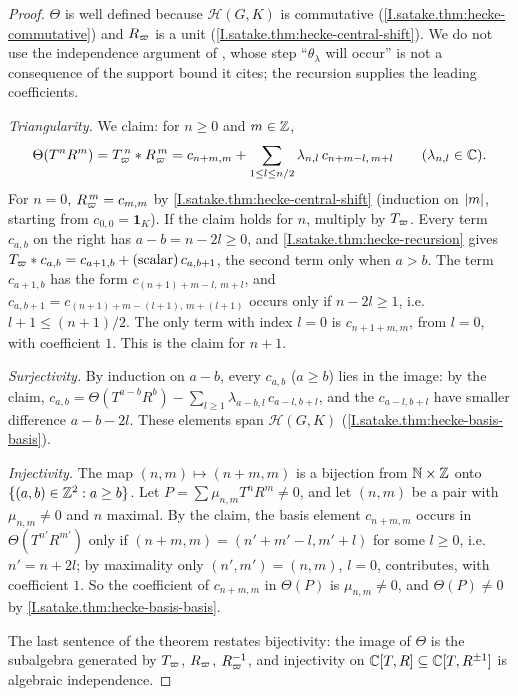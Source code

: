 \begin{theorem}
\end{theorem}
\begin{proof}
$\Theta$ is well defined because $\mathcal H(G,K)$ is commutative (\cref{I.satake.thm:hecke-commutative}) and
$R_\varpi$ is a unit (\cref{I.satake.thm:hecke-central-shift}). We do not use the independence argument of
\cite[Proposition~37]{BumpH}, whose step ``$\theta_\lambda$ will occur'' is not a consequence of the support bound it
cites; the recursion supplies the leading coefficients.

\emph{Triangularity.} We claim: for $n\ge0$ and $m\in\mathbb{Z}$,
\[
  \Theta(T^nR^m)=T_\varpi^{\,n}*R_\varpi^{\,m}=c_{n+m,m}+\sum_{1\le l\le n/2}\lambda_{n,l}\,c_{n+m-l,\,m+l}\qquad(\lambda_{n,l}\in\mathbb{C}).
\]
For $n=0$, $R_\varpi^{\,m}=c_{m,m}$ by \cref{I.satake.thm:hecke-central-shift} (induction on $\lvert m\rvert$, starting from
$c_{0,0}=\mathbf 1_K$). If the claim holds for $n$, multiply by $T_\varpi$. Every term $c_{a,b}$ on the right has
$a-b=n-2l\ge0$, and \cref{I.satake.thm:hecke-recursion} gives $T_\varpi*c_{a,b}=c_{a+1,b}+(\text{scalar})\,c_{a,b+1}$, the
second term only when $a>b$. The term $c_{a+1,b}$ has the form $c_{(n+1)+m-l,\,m+l}$, and $c_{a,b+1}=c_{(n+1)+m-(l+1),\,m+(l+1)}$
occurs only if $n-2l\ge1$, i.e.\ $l+1\le(n+1)/2$. The only term with index $l=0$ is $c_{n+1+m,m}$, from $l=0$, with
coefficient $1$. This is the claim for $n+1$.

\emph{Surjectivity.} By induction on $a-b$, every $c_{a,b}$ ($a\ge b$) lies in the image: by the claim,
$c_{a,b}=\Theta(T^{a-b}R^b)-\sum_{l\ge1}\lambda_{a-b,l}\,c_{a-l,b+l}$, and the $c_{a-l,b+l}$ have smaller difference
$a-b-2l$. These elements span $\mathcal H(G,K)$ (\cref{I.satake.thm:hecke-basis-basis}).

\emph{Injectivity.} The map $(n,m)\mapsto(n+m,m)$ is a bijection from $\mathbb{N}\times\mathbb{Z}$ onto $\{(a,b)\in\mathbb{Z}^2:a\ge b\}$. Let
$P=\sum\mu_{n,m}T^nR^m\neq0$, and let $(n,m)$ be a pair with $\mu_{n,m}\neq0$ and $n$ maximal. By the claim, the
basis element $c_{n+m,m}$ occurs in $\Theta(T^{n'}R^{m'})$ only if $(n+m,m)=(n'+m'-l,m'+l)$ for some $l\ge0$, i.e.\
$n'=n+2l$; by maximality only $(n',m')=(n,m)$, $l=0$, contributes, with coefficient $1$. So the coefficient of
$c_{n+m,m}$ in $\Theta(P)$ is $\mu_{n,m}\neq0$, and $\Theta(P)\neq0$ by \cref{I.satake.thm:hecke-basis-basis}.

The last sentence of the theorem restates bijectivity: the image of $\Theta$ is the subalgebra generated by $T_\varpi$,
$R_\varpi$, $R_\varpi^{-1}$, and injectivity on $\mathbb{C}[T,R]\subseteq\mathbb{C}[T,R^{\pm1}]$ is algebraic independence.
\end{proof}

